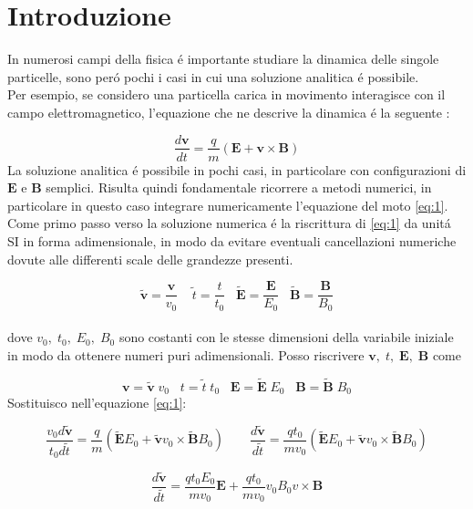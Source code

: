 \section{Introduzione}
In numerosi campi della fisica é importante studiare la dinamica delle singole particelle, sono peró pochi i casi in cui una soluzione analitica é possibile. \\
Per esempio, se considero una particella carica in movimento interagisce con il campo elettromagnetico, l'equazione che ne descrive la dinamica é la seguente :

\begin{equation} \label{eq:1}
\frac{d\mathbf{v}}{dt}=\frac{q}{m}(\mathbf{E}+\mathbf{v}\times\mathbf{B}) 
\end{equation}
La soluzione analitica é possibile in pochi casi, in particolare con configurazioni di $\mathbf{E}$ e $\mathbf{B}$ semplici. Risulta quindi fondamentale ricorrere a metodi numerici, in particolare in questo caso integrare numericamente l'equazione del moto \eqref{eq:1}.\\
Come primo passo verso la soluzione numerica é la riscrittura di \eqref{eq:1} da unitá SI in forma adimensionale, in modo da evitare eventuali cancellazioni numeriche dovute alle differenti scale delle grandezze presenti.


$$\mathbf{\mathbf{\tilde{v}}}=\frac{\mathbf{v}}{v_0} \;\;\;\;\tilde{t}=\frac{t}{t_0} \;\; \; \tilde{\mathbf{E}}=\frac{\mathbf{E}}{E_0}  \; \;\;\tilde{\mathbf{B}}=\frac{\mathbf{B}}{B_0}$$ \\
dove $v_0,\;t_0,\; E_0,\; B_0$ sono costanti con le stesse dimensioni della variabile iniziale in modo da ottenere numeri puri adimensionali.
Posso riscrivere $\mathbf{v},\;t,\;\mathbf{E},\;\mathbf{B}$ come 

$$ \mathbf{v}=\tilde{\mathbf{v}}\;v_0 \; \; \; t=\tilde{t}\;t_0 \;\; \; \mathbf{E}=\tilde{\mathbf{E}}\;E_0 \;\; \;\mathbf{B}=\tilde{\mathbf{B}}\;B_0 $$
Sostituisco nell'equazione \eqref{eq:1}:

$$\frac{v_0d\mathbf{\tilde{v}}}{t_0d\tilde{t}}=\frac{q}{m}(\mathbf{\tilde{E}}E_0+\mathbf{\mathbf{\tilde{v}}}v_0\times\mathbf{\tilde{B}}B_0) \quad  \quad \frac{d\mathbf{\tilde{v}}}{d\tilde{t}} =\frac{qt_0}{mv_0}(\mathbf{\tilde{E}}E_0+\mathbf{\tilde{v}}v_0\times\mathbf{\tilde{B}}B_0)$$

$$\frac{d\mathbf{\tilde{v}}}{d\tilde{t}}=\frac{qt_0 E_0}{mv_0}\mathbf{E}+\frac{qt_0}{mv_0}v_0 B_0  v \times \mathbf{B} $$


